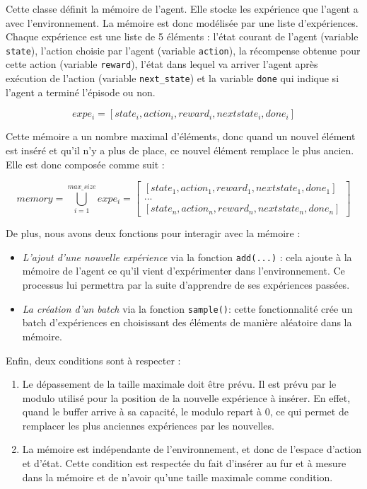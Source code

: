 \documentclass[10pt,a4paper]{article}
\begin{document}
Cette classe définit la mémoire de l'agent. Elle stocke les expérience que l'agent a avec l'environnement. La mémoire est donc modélisée par une liste d'expériences. Chaque expérience est une liste de 5 éléments : l'état courant de l'agent (variable \lstinline{state}), l'action choisie par l'agent (variable \lstinline{action}), la récompense obtenue pour cette action (variable \lstinline{reward}), l'état dans lequel va arriver l'agent après exécution de l'action (variable \lstinline{next_state}) et la variable \lstinline{done} qui indique si l'agent a terminé l'épisode ou non. 

$$
expe_i = [state_i, action_i, reward_i, nextstate_i, done_i]
$$

Cette mémoire a un nombre maximal d'éléments, donc quand un nouvel élément est inséré et qu'il n'y a plus de place, ce nouvel élément remplace le plus ancien. Elle est donc composée comme suit : 

$$
memory = \bigcup\limits_{i=1}^{max\_size} expe_{i} = 
\begin{bmatrix}
[state_1, action_1, reward_1, nextstate_1, done_1] \\
... \\
[state_n, action_n, reward_n, nextstate_n, done_n]
\end{bmatrix}
$$

De plus, nous avons deux fonctions pour interagir avec la mémoire :
\begin{itemize}
	\item \textit{L'ajout d'une nouvelle expérience} via la fonction \lstinline{add(...)} : cela ajoute à la mémoire de l'agent ce qu'il vient d'expérimenter dans l'environnement. Ce processus lui permettra par la suite d'apprendre de ses expériences passées.
	\item \textit{La création d'un batch} via la fonction \lstinline{sample()}: cette fonctionnalité crée un batch d'expériences en choisissant des éléments de manière aléatoire dans la mémoire.
\end{itemize}

Enfin, deux conditions sont à respecter :
\begin{enumerate}
	\item Le dépassement de la taille maximale doit être prévu. Il est prévu par le modulo utilisé pour la position de la nouvelle expérience à insérer. En effet, quand le buffer arrive à sa capacité, le modulo repart à 0, ce qui permet de remplacer les plus anciennes expériences par les nouvelles.
	\item La mémoire est indépendante de l’environnement, et donc de l’espace d’action et d’état. Cette condition est respectée du fait d'insérer au fur et à mesure dans la mémoire et de n'avoir qu'une taille maximale comme condition.
\end{enumerate}
\end{document}
